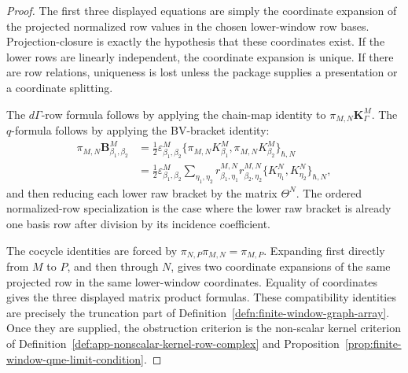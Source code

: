 \begin{proof}
  The first three displayed equations are simply the coordinate expansion of
  the projected normalized row values in the chosen lower-window row bases.
  Projection-closure is exactly the hypothesis that these coordinates
  exist.  If the lower rows are linearly independent, the coordinate
  expansion is unique.  If there are row relations, uniqueness is lost unless
  the package supplies a presentation or a coordinate splitting.

  The \(d\Gamma\)-row formula follows by applying the chain-map identity to
  \(\pi_{M,N}\mathbf K^M_\Gamma\).  The \(q\)-formula follows by applying the
  BV-bracket identity:
  \[
  \begin{aligned}
    \pi_{M,N}\mathbf B^M_{\beta_1,\beta_2}
      &=
      \frac12\varepsilon^M_{\beta_1,\beta_2}
      \{\pi_{M,N}K^M_{\beta_1},
        \pi_{M,N}K^M_{\beta_2}\}_{\hbar,N}  \\
      &=
      \frac12\varepsilon^M_{\beta_1,\beta_2}
      \sum_{\eta_1,\eta_2}
      r^{M,N}_{\beta_1,\eta_1}
      r^{M,N}_{\beta_2,\eta_2}
      \{K^N_{\eta_1},K^N_{\eta_2}\}_{\hbar,N},
  \end{aligned}
  \]
  and then reducing each lower raw bracket by the matrix \(\Theta^N\).
  The ordered normalized-row specialization is the case where the lower
  raw bracket is already one basis row after division by its incidence
  coefficient.

  The cocycle identities are forced by
  \(\pi_{N,P}\pi_{M,N}=\pi_{M,P}\).  Expanding first directly from \(M\) to
  \(P\), and then through \(N\), gives two coordinate expansions of the same
  projected row in the same lower-window coordinates.  Equality of
  coordinates gives the three displayed matrix product formulas.  These
  compatibility identities are precisely the truncation part of
  Definition~\ref{defn:finite-window-graph-array}.  Once they are supplied,
  the obstruction criterion is the non-scalar kernel criterion of
  Definition~\ref{def:app-nonscalar-kernel-row-complex} and
  Proposition~\ref{prop:finite-window-qme-limit-condition}.
\end{proof}

